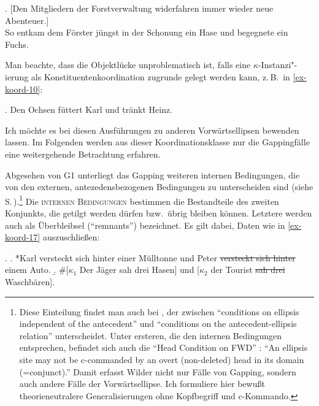\ex. \label{ex-koord-9}[Den Mitgliedern der Forstverwaltung widerfahren immer wieder neue Abenteuer.] \\
So entkam dem Förster jüngst in der Schonung ein Hase und begegnete ein Fuchs. \hfill
\citep[(44)]{Fortmann:05}

Man beachte, dass die Objektlücke unproblematisch ist, falls eine $\kappa$-Instanzi"-ierung als Konstituentenkoordination zugrunde gelegt werden kann, z.\,B.\  in \ref{ex-koord-10}:

\ex. \label{ex-koord-10}Den Ochsen füttert Karl und tränkt Heinz.\hfill\citep[(29a)]{Hoehle:83b}

Ich möchte es bei diesen Ausführungen zu anderen Vorwärtsellipsen bewenden lassen. Im Folgenden werden aus dieser Koordinationsklasse nur die Gappingfälle eine weitergehende Betrachtung erfahren.


Abgesehen von G1 unterliegt das Gapping weiteren internen Bedingungen, die von den externen, antezedensbezogenen Bedingungen zu unterscheiden sind (siehe S.\,\pageref{sec-ext-bedingungen}).\footnote{Diese Einteilung findet man auch bei \citet[(40)]{Wilder:97}, der zwischen "`conditions on ellipsis independent of the antecedent"' und "`conditions on the antecedent-ellipsis relation"' unterscheidet. Unter ersteren, die den internen Bedingungen entsprechen, befindet sich auch die "`Head Condition on FWD"' \citep[(54)]{Wilder:97}: "`An ellipsis site may not be c-commanded by an overt (non-deleted) head in its domain (=conjunct)."' Damit erfasst Wilder nicht nur Fälle von Gapping, sondern auch andere Fälle der Vorwärtsellipse. Ich formuliere hier bewu\ss t theorieneutralere Generalisierungen ohne Kopfbegriff und c-Kommando.} Die \textsc{internen Bedingungen} bestimmen die Bestandteile des zweiten Konjunkts, die getilgt werden dürfen bzw.\ übrig bleiben können. Letztere werden auch als Überbleibsel ("`remnants"') bezeichnet. Es gilt dabei, Daten wie in \ref{ex-koord-17} auszuschlie\ss en:   

\ex. \label{ex-koord-17}
\a. *Karl versteckt sich hinter einer Mülltonne und Peter \sout{versteckt sich hinter} einem Auto. \hfill \citep[148]{Hartmann:00}\label{ex-koord-17-a}
\b. \#[$\kappa_1$ Der Jäger sah drei Hasen] und [$\kappa_2$ der Tourist \sout{sah drei} Waschbären].\label{ex-koord-17-b}

